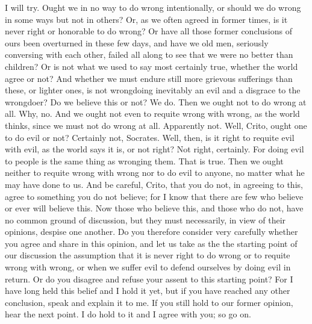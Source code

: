 \documentclass[letterpaper,12pt]{article}
\begin{document}
\begin{drama}
\critospeaks 
I will try.
\socratesspeaks 
Ought we in no way to do wrong intentionally, or should we do wrong in some ways but not in others? Or, as we often agreed in former times, is it never right or honorable to do wrong? Or have all those former conclusions of ours been overturned in these few days, and have we old men,  seriously conversing with each other, failed all along to see that we were no better than children? Or is not what we used to say most certainly true, whether the world agree or not? And whether we must endure still more grievous sufferings than these, or lighter ones, is not wrongdoing inevitably an evil and a disgrace to the wrongdoer? Do we believe this or not?
\critospeaks 
We do.
\socratesspeaks 
Then we ought not to do wrong at all.
\critospeaks 
Why, no.
\socratesspeaks 
And we ought not even to requite wrong with wrong, as the world thinks, since we must not do wrong at all. 
\critospeaks 
Apparently not.
\socratesspeaks 
Well, Crito, ought one to do evil or not?
\critospeaks 
Certainly not, Socrates.
\socratesspeaks 
Well, then, is it right to requite evil with evil, as the world says it is, or not right?
\critospeaks 
Not right, certainly.
\socratesspeaks 
For doing evil to people is the same thing as wronging them.
\critospeaks 
That is true.
\socratesspeaks 
Then we ought neither to requite wrong with wrong nor to do evil to anyone, no matter what he may have done to us.  And be careful, Crito, that you do not, in agreeing to this, agree to something you do not believe; for I know that there are few who believe or ever will believe this. Now those who believe this, and those who do not, have no common ground of discussion, but they must necessarily, in view of their opinions, despise one another. Do you therefore consider very carefully whether you agree and share in this opinion, and let us take as the the starting point of our discussion the assumption that it is never right to do wrong or to requite wrong with wrong, or when we suffer evil to defend ourselves by doing evil in return. Or do you disagree and refuse your assent  to this starting point? For I have long held this belief and I hold it yet, but if you have reached any other conclusion, speak and explain it to me. If you still hold to our former opinion, hear the next point.
\critospeaks 
I do hold to it and I agree with you; so go on.

\end{drama}
\end{document}
